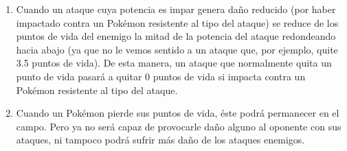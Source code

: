 \begin{enumerate}
  \item Cuando un ataque cuya potencia es impar genera daño reducido
  (por haber impactado contra un Pokémon resistente al tipo del ataque)
  se reduce de los puntos de vida del enemigo la mitad de la potencia del
  ataque redondeando hacia abajo (ya que no le vemos sentido a un ataque
  que, por ejemplo, quite 3.5 puntos de vida). De esta manera, un ataque que
  normalmente quita un punto de vida pasará a quitar 0 puntos de vida si impacta
  contra un Pokémon resistente al tipo del ataque.
  \item Cuando un Pokémon pierde sus puntos de vida, éste podrá permanecer en el campo.
  Pero ya no será capaz de provocarle daño alguno al oponente con sus ataques, ni
  tampoco podrá sufrir más daño de los ataques enemigos.
\end{enumerate}